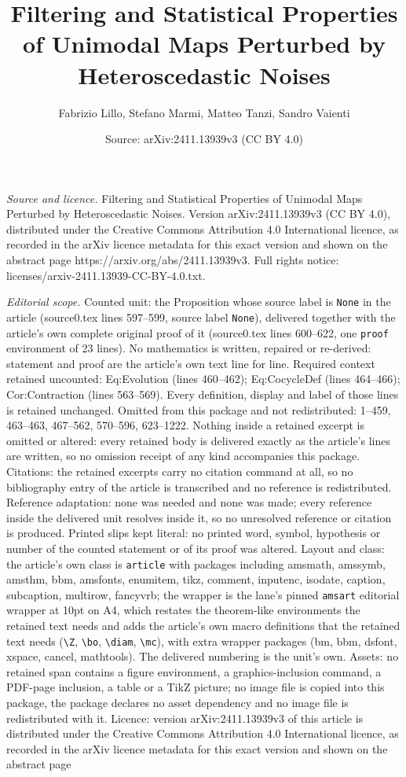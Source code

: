 \documentclass[10pt,a4paper]{amsart}
\title[Filtering and Statistical Properties of Unimodal Maps Pertur]{Filtering and Statistical Properties of Unimodal Maps Perturbed by Heteroscedastic Noises}
\author{Fabrizio Lillo, Stefano Marmi, Matteo Tanzi, Sandro Vaienti}
\date{Source: arXiv:2411.13939v3 (CC BY 4.0)}
\begin{document}
\maketitle

\noindent\emph{Source and licence.} Filtering and Statistical Properties of Unimodal Maps Perturbed by Heteroscedastic Noises. Version arXiv:2411.13939v3 (CC BY 4.0), distributed under the Creative Commons Attribution 4.0 International licence, as recorded in the arXiv licence metadata for this exact version and shown on the abstract page https://arxiv.org/abs/2411.13939v3. Full rights notice: licenses/arxiv-2411.13939-CC-BY-4.0.txt.\par\smallskip

\noindent\textit{Editorial scope.} Counted unit: the Proposition whose source label is \texttt{None} in the article (source0.tex lines 597--599, source label \texttt{None}), delivered together with the article's own complete original proof of it (source0.tex lines 600--622, one \texttt{proof} environment of 23 lines). No mathematics is written, repaired or re-derived: statement and proof are the article's own text line for line. Required context retained uncounted: Eq:Evolution (lines 460--462); Eq:CocycleDef (lines 464--466); Cor:Contraction (lines 563--569). Every definition, display and label of those lines is retained unchanged. Omitted from this package and not redistributed: 1--459, 463--463, 467--562, 570--596, 623--1222. Nothing inside a retained excerpt is omitted or altered: every retained body is delivered exactly as the article's lines are written, so no omission receipt of any kind accompanies this package. Citations: the retained excerpts carry no citation command at all, so no bibliography entry of the article is transcribed and no reference is redistributed. Reference adaptation: none was needed and none was made; every reference inside the delivered unit resolves inside it, so no unresolved reference or citation is produced. Printed slips kept literal: no printed word, symbol, hypothesis or number of the counted statement or of its proof was altered. Layout and class: the article's own class is \texttt{article} with packages including amsmath, amssymb, amsthm, bbm, amsfonts, enumitem, tikz, comment, inputenc, isodate, caption, subcaption, multirow, fancyvrb; the wrapper is the lane's pinned \texttt{amsart} editorial wrapper at 10pt on A4, which restates the theorem-like environments the retained text needs and adds the article's own macro definitions that the retained text needs (\texttt{\textbackslash Z}, \texttt{\textbackslash bo}, \texttt{\textbackslash diam}, \texttt{\textbackslash mc}), with extra wrapper packages (bm, bbm, dsfont, xspace, cancel, mathtools). The delivered numbering is the unit's own. Assets: no retained span contains a figure environment, a graphics-inclusion command, a PDF-page inclusion, a table or a TikZ picture; no image file is copied into this package, the package declares no asset dependency and no image file is redistributed with it. Licence: version arXiv:2411.13939v3 of this article is distributed under the Creative Commons Attribution 4.0 International licence, as recorded in the arXiv licence metadata for this exact version and shown on the abstract page 
\end{document}

